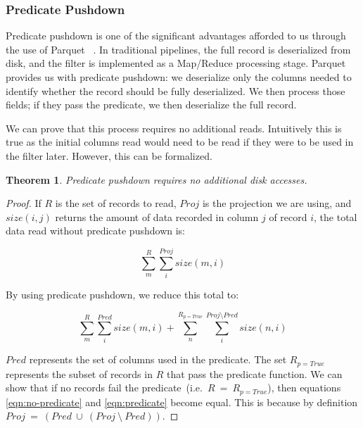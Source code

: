 \documentclass[10pt,twocolumn]{article}
\theoremstyle{plain}
\begin{document}
\subsubsection{Predicate Pushdown}
\label{sec:predicate-pushdown}

Predicate pushdown is one of the significant advantages afforded to us through the use of Parquet	~\cite{parquet}. In traditional
pipelines, the full record is deserialized from disk, and the filter is implemented as a Map/Reduce processing stage. Parquet provides
us with predicate pushdown: we deserialize only the columns needed to identify whether the record should be fully deserialized. We
then process those fields; if they pass the predicate, we then deserialize the full record.

We can prove that this process requires no additional reads. Intuitively this is true as the initial columns read would need to be read
if they were to be used in the filter later. However, this can be formalized.

\newtheorem{predicate-read-conserving}{Theorem}

\begin{predicate-read-conserving}
Predicate pushdown requires no additional disk accesses.
\end{predicate-read-conserving}

\begin{proof}

If $R$ is the set of records to read, $Proj$ is the projection we are using, and $size(i,j)$ returns the amount
of data recorded in column $j$ of record $i$, the total data read without predicate pushdown is:

\begin{equation}
\label{eqn:no-predicate}
\sum_{m}^{R}{\sum_{i}^{Proj}size(m,i)}
\end{equation}

By using predicate pushdown, we reduce this total to:

\begin{equation}
\label{eqn:predicate}
\sum_{m}^{R}{\sum_{i}^{Pred}size(m,i)} + \sum_{n}^{R_{p=True}}{\sum_{i}^{Proj \setminus Pred}size(n,i)}
\end{equation}

$Pred$ represents the set of columns used in the predicate. The set $R_{p=True}$ represents the subset of records in $R$ that pass
the predicate function. We can show that  if no records fail the predicate~(i.e.~$R~=~R_{p=True}$), then equations \ref{eqn:no-predicate}
and \ref{eqn:predicate} become equal. This is because by definition $Proj~=~(Pred~\cup~(Proj~\setminus~Pred))$.

\end{proof}
\end{document}
